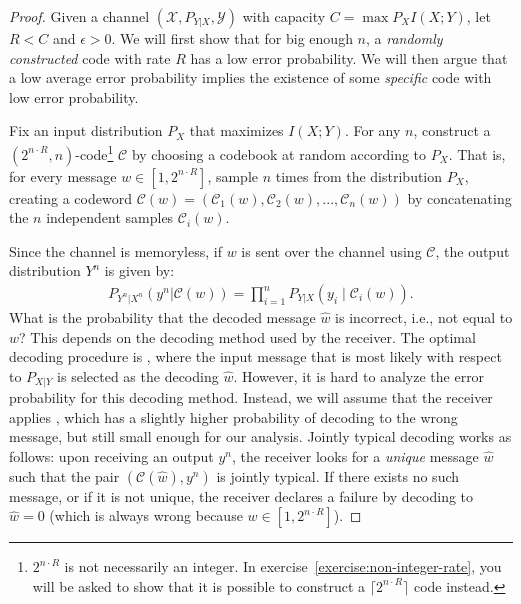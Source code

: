 \begin{proof}
\newcommand{\cran}{\ensuremath{\mathcal{C}}\xspace}
\newcommand{\xran}{\ensuremath{\mathcal{C}}\xspace}
\newcommand{\cspec}{\ensuremath{\mathcal{C}^*}\xspace}
\newcommand{\error}{\texttt{error}}
Given a channel $(\mathcal{X},P_{Y|X},\mathcal{Y})$ with capacity $C = \max{P_X} I(X;Y)$, let $R < C$ and $\epsilon > 0$. We will first show that for big enough $n$, a \emph{randomly constructed} code with rate $R$ has a low error probability. We will then argue that a low average error probability implies the existence of some \emph{specific} code with low error probability.

Fix an input distribution $P_X$ that maximizes $I(X;Y)$. For any $n$, construct a $(2^{n \cdot R},n)$-code\footnote{$2^{n \cdot R}$ is not necessarily an integer. In exercise~\ref{exercise:non-integer-rate}, you will be asked to show that it is possible to construct a $\lceil 2^{n \cdot R} \rceil$ code instead.} \cran by choosing a codebook at random according to $P_X$. That is, for every message $w \in [1,2^{n \cdot R}]$, sample $n$ times from the distribution $P_X$, creating a codeword $\cran(w) = (\xran_1(w), \xran_2(w), ..., \xran_n(w))$ by concatenating the $n$ independent samples $\xran_i(w)$.

Since the channel is memoryless, if $w$ is sent over the channel using \cran, the output distribution $Y^n$ is given by:
\begin{align}
P_{Y^n|X^n}(y^n|\cran(w)) = \prod_{i=1}^n P_{Y|X} (y_i \mid \xran_i(w)).
\end{align}
What is the probability that the decoded message $\hat{w}$ is incorrect, i.e., not equal to $w$? This depends on the decoding method used by the receiver. The optimal decoding procedure is , where the input message that is most likely with respect to $P_{X|Y}$ is selected as the decoding $\hat{w}$. However, it is hard to analyze the error probability for this decoding method. Instead, we will assume that the receiver applies , which has a slightly higher probability of decoding to the wrong message, but still small enough for our analysis. Jointly typical decoding works as follows: upon receiving an output $y^n$, the receiver looks for a \emph{unique} message $\hat{w}$ such that the pair $(\cran(\hat{w}),y^n)$ is jointly typical. If there exists no such message, or if it is not unique, the receiver declares a failure by decoding to $\hat{w} = 0$ (which is always wrong because $w \in [1, 2^{n\cdot R}]$).


\end{proof}
